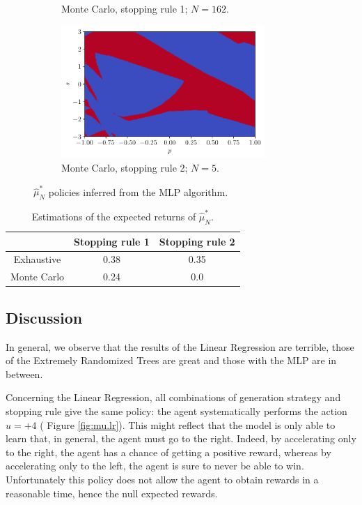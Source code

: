 \documentclass[a4paper, 12pt]{article}
\begin{document}
\begin{figure}[H]
\begin{subfigure}{0.49\textwidth}
            \caption{Monte Carlo, stopping rule 1; $N = 162$.}
        \end{subfigure}
        \hfill
        \begin{subfigure}{0.49\textwidth}
            \centering
            \includegraphics[width=0.85\textwidth]{resources/pdf/4_montecarlo_2_MLP_mu.pdf}
            \caption{Monte Carlo, stopping rule 2; $N = 5$.}
        \end{subfigure}
        \caption{$\hat{\mu}_{N}^{*}$ policies inferred from the MLP algorithm.}
        \label{fig:mu.mlp}
    \end{figure}
    
    \begin{table}[H]
        \centering
        \begin{tabular}{c|c|c}
            & Stopping rule 1 & Stopping rule 2 \\
            \hline
            Exhaustive & \num{0.38} & \num{0.35} \\
            Monte Carlo & \num{0.24} & \num{0.0} \\
        \end{tabular}
        \caption{Estimations of the expected returns of $\hat{\mu}^*_N$.}
        \label{tab:expected.return.mu.mlp}
    \end{table}
    
    \subsection{Discussion}
    
    In general, we observe that the results of the Linear Regression are terrible, those of the Extremely Randomized Trees are great and those with the MLP are in between.

    Concerning the Linear Regression, all combinations of generation strategy and stopping rule give the same policy: the agent systematically performs the action $u = +4$ (\cf{} Figure \ref{fig:mu.lr}). This might reflect that the model is only able to learn that, in general, the agent must go to the right. Indeed, by accelerating only to the right, the agent has a chance of getting a positive reward, whereas by accelerating only to the left, the agent is sure to never be able to win. Unfortunately this policy does not allow the agent to obtain rewards in a reasonable time, hence the null expected rewards.
    
\end{document}
